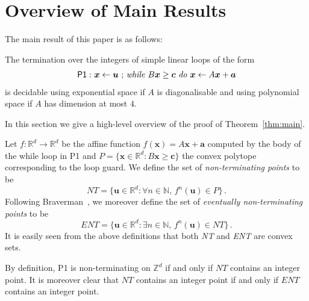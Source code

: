 \section{Overview of Main Results}
\label{sec:overview}
The main result of this paper is as follows:
\begin{theorem}
  The termination over the integers of simple linear loops of the form
\begin{gather*}
\mathsf{P1:}\  \mbox{$\boldsymbol{x}\gets \boldsymbol{u}$ ;
\textit{while} $B\boldsymbol{x} \geq \boldsymbol{c}$ \textit{do}
$\boldsymbol{x}\leftarrow A\boldsymbol{x}+\boldsymbol{a}$}
\end{gather*}
is decidable using exponential space if $A$ is diagonalisable and
using polynomial space if $A$ has dimension at most $4$.
\label{thm:main}
\end{theorem}
In this section we give a high-level overview of the proof of Theorem~\ref{thm:main}.

Let $f:\mathbb{R}^d\rightarrow \mathbb{R}^d$ be the affine function
$f(\boldsymbol{x})=A\boldsymbol{x}+\boldsymbol a$ computed by the body
of the while loop in \textsf{P1} and $P=\{ \boldsymbol{x} \in
\mathbb{R}^d: B \boldsymbol{x}\geq \boldsymbol{c}\}$ the convex polytope
corresponding to the loop guard.  We define the set of
\emph{non-terminating points} to be
\[ \mathit{NT} = \{ \boldsymbol{u}\in \mathbb{R}^d : \forall n \in
\mathbb{N},\, f^n(\boldsymbol{u}) \in P \} \, .\] Following
Braverman~\cite{Bra06}, we moreover define the set of \emph{eventually
  non-terminating points} to be
\[ \mathit{ENT} = \{ \boldsymbol{u}\in \mathbb{R}^d : \exists n \in
\mathbb{N},\, f^n(\boldsymbol{u}) \in \mathit{NT} \} \, .\]
It is easily seen from the above definitions that both \textit{NT} and
\textit{ENT} are convex sets.

By definition, \textsf{P1} is non-terminating on $\mathbb{Z}^d$ if
and only if $\mathit{NT}$ contains an integer point.  It is moreover
clear that $\mathit{NT}$ contains an integer point if and only if
$\mathit{ENT}$ contains an integer point.


